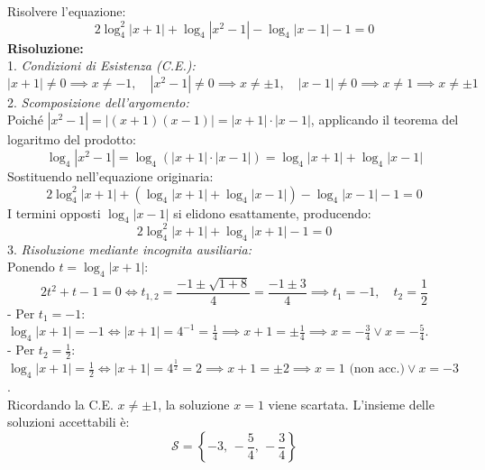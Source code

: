 \documentclass[11pt,a4paper,oneside]{report}
\begin{document}
\begin{esercizio}
Risolvere l'equazione:
\begin{equation}
2\log_4^2|x + 1| + \log_4|x^2 - 1| - \log_4|x - 1| - 1 = 0
\end{equation}
\textbf{Risoluzione:}\\
1. \textit{Condizioni di Esistenza (C.E.):}
\begin{equation}
|x + 1| \neq 0 \implies x \neq -1, \quad |x^2 - 1| \neq 0 \implies x \neq \pm 1, \quad |x - 1| \neq 0 \implies x \neq 1 \implies x \neq \pm 1
\end{equation}
2. \textit{Scomposizione dell'argomento:}\\
Poich\'e $|x^2 - 1| = |(x + 1)(x - 1)| = |x + 1| \cdot |x - 1|$, applicando il teorema del logaritmo del prodotto:
\begin{equation}
\log_4|x^2 - 1| = \log_4(|x + 1| \cdot |x - 1|) = \log_4|x + 1| + \log_4|x - 1|
\end{equation}
Sostituendo nell'equazione originaria:
\begin{equation}
2\log_4^2|x + 1| + (\log_4|x + 1| + \log_4|x - 1|) - \log_4|x - 1| - 1 = 0
\end{equation}
I termini opposti $\log_4|x - 1|$ si elidono esattamente, producendo:
\begin{equation}
2\log_4^2|x + 1| + \log_4|x + 1| - 1 = 0
\end{equation}
3. \textit{Risoluzione mediante incognita ausiliaria:}\\
Ponendo $t = \log_4|x + 1|$:
\begin{equation}
2t^2 + t - 1 = 0 \iff t_{1,2} = \frac{-1 \pm \sqrt{1 + 8}}{4} = \frac{-1 \pm 3}{4} \implies t_1 = -1, \quad t_2 = \frac{1}{2}
\end{equation}
- Per $t_1 = -1$: $\log_4|x + 1| = -1 \iff |x + 1| = 4^{-1} = \frac{1}{4} \implies x + 1 = \pm \frac{1}{4} \implies x = -\frac{3}{4} \lor x = -\frac{5}{4}$.\\
- Per $t_2 = \frac{1}{2}$: $\log_4|x + 1| = \frac{1}{2} \iff |x + 1| = 4^{\frac{1}{2}} = 2 \implies x + 1 = \pm 2 \implies x = 1 \text{ (non acc.)} \lor x = -3$.\\
Ricordando la C.E. $x \neq \pm 1$, la soluzione $x = 1$ viene scartata. L'insieme delle soluzioni accettabili \`e:
\begin{equation}
\mathcal{S} = \left\{-3, \, -\frac{5}{4}, \, -\frac{3}{4}\right\}
\end{equation}
\end{esercizio}
\end{document}

